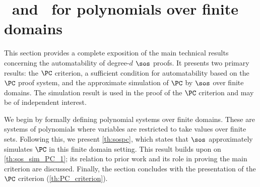 \documentclass[11pt]{article}
\begin{document}


\section{\sos\ and \PC\ for polynomials over finite domains}\label{sect:PC_criterion}

This section provides a complete exposition of the main technical results concerning the automatability of degree-$d$ $\sos$ proofs. It presents two primary results: the $\PC$ criterion, a sufficient condition for automatability based on the $\PC$ proof system, and the approximate simulation of $\PC$ by $\sos$ over finite domains. The simulation result is used in the proof of the $\PC$ criterion and may be of independent interest.

We begin by formally defining polynomial systems over finite domains. These are systems of polynomials where variables are restricted to take values over finite sets. Following this, we present \cref{th:sospc}, which states that $\sos$ approximately simulates $\PC$ in this finite domain setting. This result builds upon on \cref{th:sos_sim_PC_1}; its relation to prior work and its role in proving the main criterion are discussed. Finally, the section concludes with the presentation of the $\PC$ criterion (\cref{th:PC_criterion}). 
\end{document}
